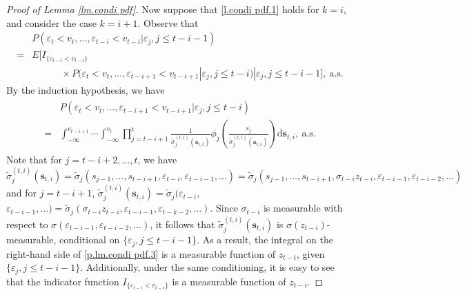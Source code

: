 \documentclass[ejsv2]{imsart}
\theoremstyle{plain}
\theoremstyle{definition}
\theoremstyle{remark}
\begin{document}
\begin{proof}[Proof of Lemma \ref{lm.condi pdf}]
Now suppose that \eqref{l.condi pdf.1} holds for $k=i$, and consider the case $k=i+1$. Observe that
\begin{equation}\label{p.lm.condi pdf.2}
\begin{split}
    & P(\varepsilon_t<v_t,\ldots,\varepsilon_{t-i}<v_{t-i}|\varepsilon_{j},j\leq t-i-1) \\
    = & E[I_{\{\varepsilon_{t-i}<v_{t-i}\}}\\
    &\hspace{3em}\times P(\varepsilon_t<v_t,\ldots,\varepsilon_{t-i+1}<v_{t-i+1}|\varepsilon_{j},j\leq t-i)|\varepsilon_{j},j\leq t-i-1],\ \textrm{a.s}.
\end{split}
\end{equation}
By the induction hypothesis, we have
\begin{align}\label{p.lm.condi pdf.3}
\begin{split}
&P(\varepsilon_t<v_t,\ldots,\varepsilon_{t-i+1}<v_{t-i+1}|\varepsilon_{j},j\leq t-i)\\
=
& \int_{-\infty}^{v_{t-i+1}}\cdots\int_{-\infty}^{v_t}\prod_{j=t-i+1}^{t}\frac{1}{{\tilde{\sigma}}^{(t,i)}_{j}({\mathbf{s}}_{t,i})}\phi_{j}(\frac{{s}_j}{{\tilde{\sigma}}^{(t,i)}_{j}({\mathbf{s}}_{t,i})})\mathrm{d}{\mathbf{s}}_{t,i},\ \textrm{a.s.}
\end{split}
\end{align}
Note that %
for $j=t-i+2,\ldots,t$, we have
$\tilde{\sigma}^{(t,i)}_{j}({\mathbf{s}}_{t,i})=\tilde{\sigma}_j(s_{j-1},\ldots,s_{t-i+1},\varepsilon_{t-i},\varepsilon_{t-i-1},\ldots)=\tilde{\sigma}_j(s_{j-1},\ldots,s_{t-i+1},\sigma_{t-i}z_{t-i},\varepsilon_{t-i-1},\varepsilon_{t-i-2},\ldots)$ and for $j=t-i+1$, $\tilde{\sigma}^{(t,i)}_{j}({\mathbf{s}}_{t,i})=\tilde{\sigma}_j(\varepsilon_{t-i},$ $\varepsilon_{t-i-1},\ldots)=\tilde{\sigma}_j(\sigma_{t-i}z_{t-i},\varepsilon_{t-i-1},\varepsilon_{t-k-2},\ldots)$. 
Since $\sigma_{t-i}$ is measurable with respect to $\sigma(\varepsilon_{t-i-1},\varepsilon_{t-i-2},\ldots)$, it follows that $\tilde{\sigma}^{(t,i)}_{j}({\mathbf{s}}_{t,i})$ is $\sigma(z_{t-i})$-measurable, conditional on $\{\varepsilon_{j},j\leq t-i-1\}$. 
As a result, the integral on the right-hand side of \eqref{p.lm.condi pdf.3} is a measurable function of $z_{t-i}$, given $\{\varepsilon_{j},j\leq t-i-1\}$. 
Additionally, under the same conditioning, it is easy to see that the indicator function $I_{\{\varepsilon_{t-i}<v_{t-i}\}}$ is a measurable function of 
$z_{t-i}$.


\end{proof}
\end{document}

